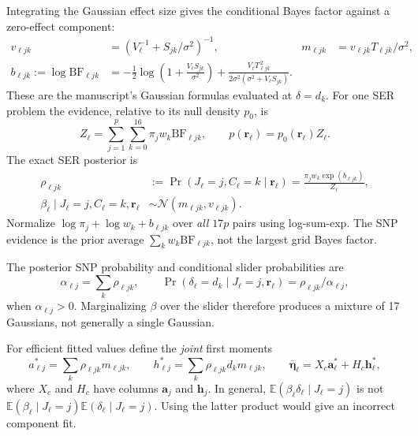 \documentclass[11pt]{article}
\newcommand{\Normal}{\mathcal N}
\newcommand{\BF}{\mathrm{BF}}
\newcommand{\E}{\mathbb E}
\newcommand{\etal}{\overline{\boldsymbol\eta}}
\begin{document}
Integrating the Gaussian effect size gives the conditional Bayes factor
against a zero-effect component:
\begin{align}
 v_{\ell jk}&=\left(V_\ell^{-1}+S_{jk}/\sigma^2\right)^{-1},&
 m_{\ell jk}&=v_{\ell jk}T_{\ell jk}/\sigma^2,\label{eq:moments}\\
 b_{\ell jk}:=\log\BF_{\ell jk}
 &=-\frac12\log\left(1+\frac{V_\ell S_{jk}}{\sigma^2}\right)
 +\frac{V_\ell T_{\ell jk}^{\,2}}
 {2\sigma^2(\sigma^2+V_\ell S_{jk})}.
 \label{eq:bf}
\end{align}
These are the manuscript's Gaussian formulas evaluated at $\delta=d_k$.
For one SER problem the evidence, relative to its null density $p_0$, is
\begin{equation}
 Z_\ell=\sum_{j=1}^p\sum_{k=0}^{16}\pi_jw_k\BF_{\ell jk},
 \qquad p(\mathbf r_\ell)=p_0(\mathbf r_\ell)Z_\ell.
 \label{eq:evidence}
\end{equation}
The exact SER posterior is
\begin{align}
 \rho_{\ell jk}
 &:=\Pr(J_\ell=j,C_\ell=k\mid\mathbf r_\ell)
   =\frac{\pi_jw_k\exp(b_{\ell jk})}{Z_\ell},\label{eq:rho}\\
 \beta_\ell\mid J_\ell=j,C_\ell=k,\mathbf r_\ell
 &\sim\Normal(m_{\ell jk},v_{\ell jk}).\label{eq:beta}
\end{align}
Normalize $\log\pi_j+\log w_k+b_{\ell jk}$ over \emph{all} $17p$ pairs
using log-sum-exp. The SNP evidence is the prior average
$\sum_k w_k\BF_{\ell jk}$, not the largest grid Bayes factor.

The posterior SNP probability and conditional slider probabilities are
\begin{equation}
 \alpha_{\ell j}=\sum_k\rho_{\ell jk},\qquad
 \Pr(\delta_\ell=d_k\mid J_\ell=j,\mathbf r_\ell)
       =\rho_{\ell jk}/\alpha_{\ell j},
 \label{eq:marginals}
\end{equation}
when $\alpha_{\ell j}>0$. Marginalizing $\beta$ over the slider therefore
produces a mixture of 17 Gaussians, not generally a single Gaussian.

For efficient fitted values define the \emph{joint} first moments
\begin{equation}
 a_{\ell j}^{*}=\sum_k\rho_{\ell jk}m_{\ell jk},\qquad
 h_{\ell j}^{*}=\sum_k\rho_{\ell jk}d_km_{\ell jk},\qquad
 \etal_\ell=X_c\mathbf a_\ell^{*}+H_c\mathbf h_\ell^{*},
 \label{eq:fit}
\end{equation}
where $X_c$ and $H_c$ have columns $\mathbf a_j$ and $\mathbf h_j$.
In general, $\E(\beta_\ell\delta_\ell\mid J_\ell=j)$ is not
$\E(\beta_\ell\mid J_\ell=j)\E(\delta_\ell\mid J_\ell=j)$.
Using the latter product would give an incorrect component fit.
\end{document}
